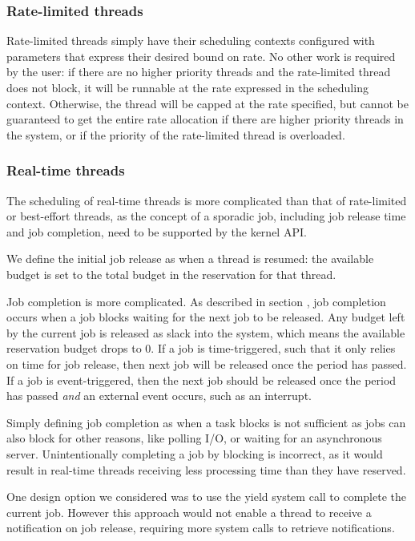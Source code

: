 \subsubsection{Rate-limited threads}

Rate-limited threads simply have their scheduling contexts configured with parameters that express their desired bound on rate.
No other work is required by the user: if there are no higher priority threads and the rate-limited thread does not block, it will be runnable at the rate expressed in the scheduling context.
Otherwise, the thread will be capped at the rate specified, but cannot be guaranteed to get the entire rate allocation if there are higher priority threads in the system, or if the priority of the rate-limited thread is overloaded.

\subsubsection{Real-time threads}

The scheduling of real-time threads is more complicated than that of rate-limited or best-effort threads, as the concept of a sporadic job, including job release time and job completion, need to be supported by the kernel API.

We define the initial job release as when a thread is resumed: the available budget is set to the total budget in the reservation for that thread.

Job completion is more complicated.
As described in section , job completion occurs when a job blocks waiting for the next job to be released.
Any budget left by the current job is released as slack into the system, which means the available reservation budget drops to 0.
If a job is time-triggered, such that it only relies on time for job release, then next job will be released once the period has passed.
If a job is event-triggered, then the next job should be released once the period has passed \textit{and} an external event occurs, such as an interrupt.

Simply defining job completion as when a task blocks is not sufficient as jobs can also block for other reasons, like polling I/O, or waiting for an asynchronous server.
Unintentionally completing a job by blocking is incorrect, as it would result in real-time threads receiving less processing time than they have reserved.

One design option we considered was to use the yield system call to complete the current job.
However this approach would not enable a thread to receive a notification on job release, requiring more system calls to retrieve notifications.

